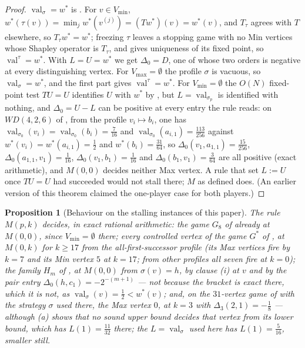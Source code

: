 \documentclass[11pt]{article}
\theoremstyle{plain}
\newtheorem{proposition}[theorem]{Proposition}
\theoremstyle{definition}
\DeclareMathOperator{\val}{val}
\newcommand{\Vmax}{V_{\max}}
\newcommand{\Vmin}{V_{\min}}
\begin{document}
\begin{proof}
$\val_\sigma=w^\ast$ is . For $v\in\Vmin$,
$w^\ast(\tau(v))=\min_j w^\ast(v^{(j)})=(Tw^\ast)(v)=w^\ast(v)$, and
$T_\tau$ agrees with $T$ elsewhere, so $T_\tau w^\ast=w^\ast$; freezing
$\tau$ leaves a stopping game with no Min vertices whose Shapley operator
is $T_\tau$, and  gives uniqueness of its fixed
point, so $\val^\tau=w^\ast$. With $L=U=w^\ast$ we get $\Delta_0=D$, one
of whose two orders is negative at every distinguishing vertex. For
$\Vmax=\emptyset$ the profile $\sigma$ is vacuous, so $\val_\sigma=w^\ast$,
and the first part gives $\val^\tau=w^\ast$. For $\Vmin=\emptyset$ the
$O(N)$ fixed-point test $TU=U$ identifies $U$ with $w^\ast$ by
, but $L=\val_{\sigma_p}$ is identified with
nothing, and $\Delta_0=U-L$ can be positive at every entry the rule
reads: on $WD(4,2,6)$ of , from the profile
$v_i\mapsto b_i$, one has $\val_{\sigma_0}(v_i)=\val_{\sigma_0}(b_i)=\tfrac7{16}$
and $\val_{\sigma_0}(a_{i,1})=\tfrac{113}{256}$ against
$w^\ast(v_i)=w^\ast(a_{i,1})=\tfrac12$ and $w^\ast(b_i)=\tfrac{31}{64}$,
so $\Delta_0(v_1,a_{1,1})=\tfrac{15}{256}$,
$\Delta_0(a_{1,1},v_1)=\tfrac1{16}$, $\Delta_0(v_1,b_1)=\tfrac1{16}$ and
$\Delta_0(b_1,v_1)=\tfrac3{64}$ are all positive (exact arithmetic), and
$M(0,0)$ decides neither Max vertex. A rule that set $L:=U$ once $TU=U$
had succeeded would not stall there; $M$ as defined does. (An earlier
version of this theorem claimed the one-player case for both players.)
\end{proof}

\begin{proposition}[Behaviour on the stalling instances of this paper]\label{prop:seeded-decides}
The rule $M(p,k)$ decides, in exact rational arithmetic: the game $G_8$
of  already at $M(0,0)$, since $\Vmin=\emptyset$
there; every controlled vertex of the game $G^{\ast}$ of
, at $M(0,k)$ for $k\ge17$ from the
all-first-successor profile (its Max vertices fire by $k=7$ and its Min
vertex $5$ at $k=17$; from other profiles all seven fire at $k=0$); the
family $H_m$ of , at $M(0,0)$ from $\sigma(v)=h$, by
clause (i) at $v$ and by the pair entry $\Delta_0(h,c_1)=-2^{-(m+1)}$ ---
not because the bracket is exact there, which it is not, as
$\val_\sigma(v)=\tfrac12<w^\ast(v)$; and, on the $31$-vertex game of
 with the strategy $\sigma$ used there, the
Max vertex $0$, at $k=3$ with $\Delta_3(2,1)=-\tfrac18$ --- although
(a) shows that \emph{no} sound upper bound
decides that vertex from its lower bound, which has $L(1)=\tfrac{11}{32}$
there; the $L=\val_\sigma$ used here has $L(1)=\tfrac5{16}$, smaller still.
\end{proposition}
\end{document}
